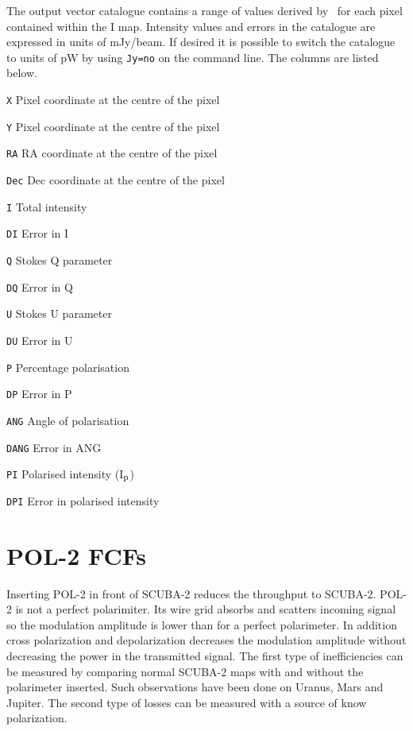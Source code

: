 The output vector catalogue contains a range of values derived by
\poltwomap\ for each pixel contained within the I map. Intensity values and
errors in the
catalogue are expressed in units of mJy/beam.  If desired it is possible
to switch the catalogue to units of pW by using \texttt{Jy=no} on the 
command line.  The columns are listed below.

\begin{aligndesc}
\item[\texttt{X}] Pixel coordinate at the centre of the pixel
\item[\texttt{Y}] Pixel coordinate at the centre of the pixel
\item[\texttt{RA}] RA coordinate at the centre of the pixel
\item[\texttt{Dec}] Dec coordinate at the centre of the pixel
\item[\texttt{I}] Total intensity
\item[\texttt{DI}] Error in I
\item[\texttt{Q}] Stokes Q parameter
\item[\texttt{DQ}] Error in Q
\item[\texttt{U}] Stokes U parameter
\item[\texttt{DU}] Error in U
\item[\texttt{P}] Percentage polarisation
\item[\texttt{DP}] Error in P
\item[\texttt{ANG}] Angle of polarisation
\item[\texttt{DANG}] Error in ANG
\item[\texttt{PI}] Polarised intensity (I$_{\textnormal{p}}$)
\item[\texttt{DPI}] Error in polarised intensity
\end{aligndesc}


\section{POL-2 FCFs}
\label{sec:pol2map-fcf}

Inserting POL-2 in front of SCUBA-2 reduces the throughput to SCUBA-2.
POL-2 is not a perfect polarimiter. Its wire grid absorbs and scatters incoming
signal so the modulation amplitude is lower than for a perfect polarimeter.
In addition cross polarization and depolarization decreases the modulation
amplitude without decreasing the power in the transmitted signal. The first
type of inefficiencies can be measured by comparing normal SCUBA-2 maps with
and without the polarimeter inserted. Such observations have been done on Uranus,
Mars and Jupiter. The second type of losses can be measured with a source of know polarization.

